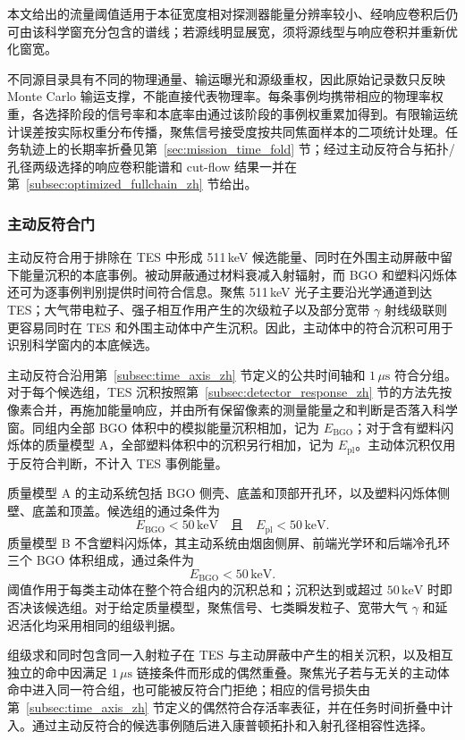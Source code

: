 \documentclass[11pt]{article}
\newcommand{\keV}{\,\mathrm{keV}}
\begin{document}
本文给出的流量阈值适用于本征宽度相对探测器能量分辨率较小、经响应卷积后仍可由该科学窗充分包含的谱线；若源线明显展宽，须将源线型与响应卷积并重新优化窗宽。

不同源目录具有不同的物理通量、输运曝光和源级重权，因此原始记录数只反映 Monte Carlo 输运支撑，不能直接代表物理率。每条事例均携带相应的物理率权重，各选择阶段的信号率和本底率由通过该阶段的事例权重累加得到。有限输运统计误差按实际权重分布传播，聚焦信号接受度按共同焦面样本的二项统计处理。任务轨迹上的长期率折叠见第~\ref{sec:mission_time_fold} 节；经过主动反符合与拓扑/孔径两级选择的响应卷积能谱和 cut-flow 结果一并在第~\ref{subsec:optimized_fullchain_zh} 节给出。

\subsubsection{主动反符合门}

主动反符合用于排除在 TES 中形成 511\,keV 候选能量、同时在外围主动屏蔽中留下能量沉积的本底事例。被动屏蔽通过材料衰减入射辐射，而 BGO 和塑料闪烁体还可为逐事例判别提供时间符合信息。聚焦 511\,keV 光子主要沿光学通道到达 TES；大气带电粒子、强子相互作用产生的次级粒子以及部分宽带 $\gamma$ 射线级联则更容易同时在 TES 和外围主动体中产生沉积。因此，主动体中的符合沉积可用于识别科学窗内的本底候选。

主动反符合沿用第~\ref{subsec:time_axis_zh} 节定义的公共时间轴和 $1\,\mu\mathrm{s}$ 符合分组。对于每个候选组，TES 沉积按照第~\ref{subsec:detector_response_zh} 节的方法先按像素合并，再施加能量响应，并由所有保留像素的测量能量之和判断是否落入科学窗。同组内全部 BGO 体积中的模拟能量沉积相加，记为 $E_{\mathrm{BGO}}$；对于含有塑料闪烁体的质量模型 A，全部塑料体积中的沉积另行相加，记为 $E_{\mathrm{pl}}$。主动体沉积仅用于反符合判断，不计入 TES 事例能量。

质量模型 A 的主动系统包括 BGO 侧壳、底盖和顶部开孔环，以及塑料闪烁体侧壁、底盖和顶盖。候选组的通过条件为
\[
 E_{\mathrm{BGO}}<50\keV
 \quad\text{且}\quad
 E_{\mathrm{pl}}<50\keV .
\]
质量模型 B 不含塑料闪烁体，其主动系统由烟囱侧屏、前端光学环和后端冷孔环三个 BGO 体积组成，通过条件为
\[
 E_{\mathrm{BGO}}<50\keV .
\]
阈值作用于每类主动体在整个符合组内的沉积总和；沉积达到或超过 $50\keV$ 时即否决该候选组。对于给定质量模型，聚焦信号、七类瞬发粒子、宽带大气 $\gamma$ 和延迟活化均采用相同的组级判据。

组级求和同时包含同一入射粒子在 TES 与主动屏蔽中产生的相关沉积，以及相互独立的命中因满足 $1\,\mu\mathrm{s}$ 链接条件而形成的偶然重叠。聚焦光子若与无关的主动体命中进入同一符合组，也可能被反符合门拒绝；相应的信号损失由第~\ref{subsec:time_axis_zh} 节定义的偶然符合存活率表征，并在任务时间折叠中计入。通过主动反符合的候选事例随后进入康普顿拓扑和入射孔径相容性选择。
\end{document}
